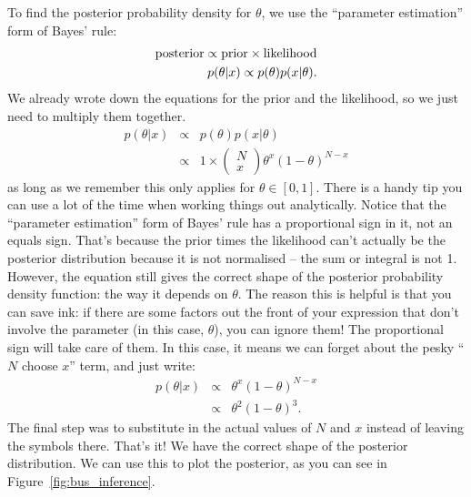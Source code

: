 To find the posterior probability density for $\theta$, we use the ``parameter
estimation'' form of Bayes' rule:
\begin{eqnarray}
\textnormal{posterior} \propto \textnormal{prior} \times \textnormal{likelihood}\\
p(\theta|x) \propto p(\theta)p(x|\theta).
\end{eqnarray}
We already wrote down the equations for the prior and the likelihood, so we
just need to multiply them together.
\begin{eqnarray}
p(\theta|x) &\propto& p(\theta)p(x|\theta)\\
&\propto& 1 \times \left(\begin{array}{c}N \\ x\end{array}\right)
\theta^x\left(1-\theta\right)^{N - x}
\end{eqnarray}
as long as we remember this only applies for $\theta \in [0, 1]$.
There is a handy tip you can use a lot of the
time when working things out analytically. Notice that the ``parameter estimation''
form of Bayes' rule has a proportional sign in it, not an equals sign. That's
because the prior times the likelihood can't actually be the posterior
distribution because it is not normalised -- the sum or integral is not 1.
However, the equation still gives the correct shape of the posterior probability density
function: the way it depends on $\theta$. The reason this is helpful is that
you can save ink: if there are some factors out the front of your expression
that don't involve the parameter (in this case, $\theta$), you can ignore them!
The proportional sign will take care of them. In this case, it means we can
forget about the pesky ``$N$ choose $x$'' term, and just write:
\begin{eqnarray}
p(\theta|x) &\propto& \theta^x\left(1-\theta\right)^{N - x}\\
&\propto& \theta^2\left(1-\theta\right)^3.
\end{eqnarray}
The final step was to substitute in the actual values of $N$ and $x$ instead of
leaving the symbols there. That's it! We have the correct shape of the
posterior distribution. We can use this to plot the posterior, as you can see
in Figure~\ref{fig:bus_inference}.

